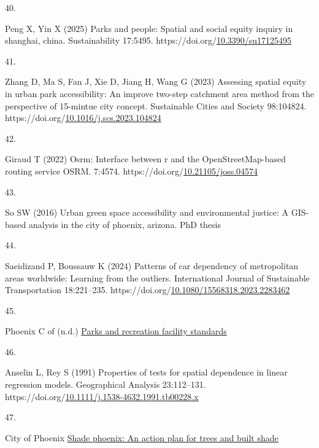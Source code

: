 \documentclass[
  sn-basic,
]{sn-jnl}
\newlength{\cslhangindent}
\newlength{\csllabelwidth}
\newenvironment{CSLReferences}[2] %
 {\begin{list}{}{%
  \setlength{\itemindent}{0pt}
  \setlength{\leftmargin}{0pt}
  \setlength{\parsep}{0pt}
  \ifodd #1
   \setlength{\leftmargin}{\cslhangindent}
   \setlength{\itemindent}{-1\cslhangindent}
  \fi
  \setlength{\itemsep}{#2\baselineskip}}}
 {\end{list}}
\newcommand{\CSLLeftMargin}[1]{\parbox[t]{\csllabelwidth}{\strut#1\strut}}
\newcommand{\CSLRightInline}[1]{\parbox[t]{\linewidth - \csllabelwidth}{\strut#1\strut}}
\begin{document}
\begin{CSLReferences}{0}{1}
\CSLLeftMargin{40. }%
\CSLRightInline{Peng X, Yin X (2025) Parks and people: Spatial and
social equity inquiry in shanghai, china. Sustainability 17:5495.
https://doi.org/\href{https://doi.org/10.3390/su17125495}{10.3390/su17125495}}

\CSLLeftMargin{41. }%
\CSLRightInline{Zhang D, Ma S, Fan J, Xie D, Jiang H, Wang G (2023)
Assessing spatial equity in urban park accessibility: An improve
two-step catchment area method from the perspective of 15-mintue city
concept. Sustainable Cities and Society 98:104824.
https://doi.org/\href{https://doi.org/10.1016/j.scs.2023.104824}{10.1016/j.scs.2023.104824}}

\CSLLeftMargin{42. }%
\CSLRightInline{Giraud T (2022) {\textbraceleft}Osrm: Interface between
r and the OpenStreetMap-based routing service OSRM{\textbraceright}.
7:4574.
https://doi.org/\href{https://doi.org/10.21105/joss.04574}{10.21105/joss.04574}}

\CSLLeftMargin{43. }%
\CSLRightInline{So SW (2016) Urban green space accessibility and
environmental justice: A GIS-based analysis in the city of phoenix,
arizona. PhD thesis}

\CSLLeftMargin{44. }%
\CSLRightInline{Saeidizand P, Boussauw K (2024) Patterns of car
dependency of metropolitan areas worldwide: Learning from the outliers.
International Journal of Sustainable Transportation 18:221--235.
https://doi.org/\href{https://doi.org/10.1080/15568318.2023.2283462}{10.1080/15568318.2023.2283462}}

\CSLLeftMargin{45. }%
\CSLRightInline{Phoenix C of (n.d.)
\href{https://web-prod.phoenix.gov/content/dam/phoenix/pddsite/documents/planning-zoning-general-plan/parks-rec-facility-standards.pdf}{Parks
and recreation facility standards}}

\CSLLeftMargin{46. }%
\CSLRightInline{Anselin L, Rey S (1991) Properties of tests for spatial
dependence in linear regression models. Geographical Analysis
23:112--131.
https://doi.org/\href{https://doi.org/10.1111/j.1538-4632.1991.tb00228.x}{10.1111/j.1538-4632.1991.tb00228.x}}

\CSLLeftMargin{47. }%
\CSLRightInline{City of Phoenix
\href{https://www.phoenix.gov/content/dam/phoenix/heatsite/documents/BP_ShadePhoenixPlan_Report_031025_EN.pdf}{Shade
phoenix: An action plan for trees and built shade}}


\end{CSLReferences}
\end{document}
